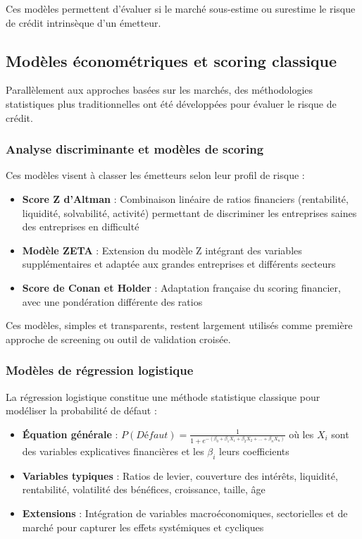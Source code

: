 Ces modèles permettent d'évaluer si le marché sous-estime ou surestime le risque de crédit intrinsèque d'un émetteur.

\subsection{Modèles économétriques et scoring classique}

Parallèlement aux approches basées sur les marchés, des méthodologies statistiques plus traditionnelles ont été développées pour évaluer le risque de crédit.

\subsubsection{Analyse discriminante et modèles de scoring}

Ces modèles visent à classer les émetteurs selon leur profil de risque :

\begin{itemize}
    \item \textbf{Score Z d'Altman} : Combinaison linéaire de ratios financiers (rentabilité, liquidité, solvabilité, activité) permettant de discriminer les entreprises saines des entreprises en difficulté
    
    \item \textbf{Modèle ZETA} : Extension du modèle Z intégrant des variables supplémentaires et adaptée aux grandes entreprises et différents secteurs
    
    \item \textbf{Score de Conan et Holder} : Adaptation française du scoring financier, avec une pondération différente des ratios
\end{itemize}

Ces modèles, simples et transparents, restent largement utilisés comme première approche de screening ou outil de validation croisée.

\subsubsection{Modèles de régression logistique}

La régression logistique constitue une méthode statistique classique pour modéliser la probabilité de défaut :

\begin{itemize}
    \item \textbf{Équation générale} : $P(Défaut) = \frac{1}{1 + e^{-(\beta_0 + \beta_1 X_1 + \beta_2 X_2 + ... + \beta_n X_n)}}$ où les $X_i$ sont des variables explicatives financières et les $\beta_i$ leurs coefficients
    
    \item \textbf{Variables typiques} : Ratios de levier, couverture des intérêts, liquidité, rentabilité, volatilité des bénéfices, croissance, taille, âge
    
    \item \textbf{Extensions} : Intégration de variables macroéconomiques, sectorielles et de marché pour capturer les effets systémiques et cycliques
\end{itemize}

